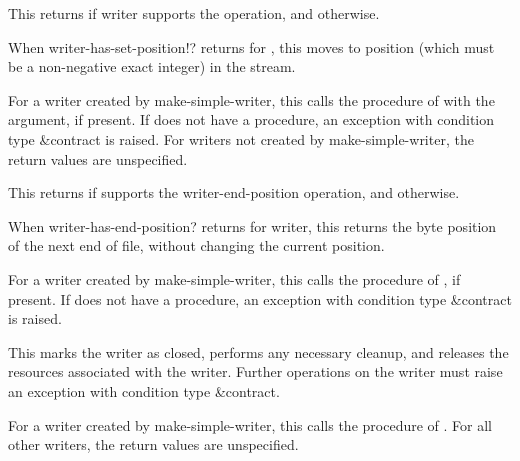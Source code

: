 \begin{entry}{%
}
   
This returns \schtrue{} if writer supports the  operation, and
\schfalse{} otherwise.
\end{entry}

\begin{entry}{%
}
   
When {\cf writer-has-set-position!?} returns \schtrue{} for
, this moves to position  (which must be a non-negative
exact integer) in the stream.
   
For a writer created by {\cf make-simple-writer}, this calls the
  procedure of  with the 
argument, if present. If  does not have a
 procedure, an exception with condition type
{\cf\&contract} is raised.  For writers not created by {\cf
  make-simple-writer}, the return values are unspecified.
\end{entry}

\begin{entry}{%
}
   
This returns \schtrue{} if  supports the {\cf
  writer-end-position} operation, and \schfalse{} otherwise.
\end{entry}

\begin{entry}{%
}
   
When {\cf writer-has-end-position?} returns \schtrue{} for writer,
this returns the byte position of the next end of file, without
changing the current position.
   
For a writer created by {\cf make-simple-writer}, this calls the
 procedure of , if present. If 
does not have a  procedure, an exception with condition
type {\cf\&contract} is raised.
\end{entry}

\begin{entry}{%
}
   
This marks the writer as closed, performs any necessary cleanup, and
releases the resources associated with the writer. Further operations
on the writer must raise an exception with condition type
{\cf\&contract}.
   
For a writer created by {\cf make-simple-writer}, this calls the
 procedure of .  For all other writers,
the return values are unspecified.
\end{entry}

